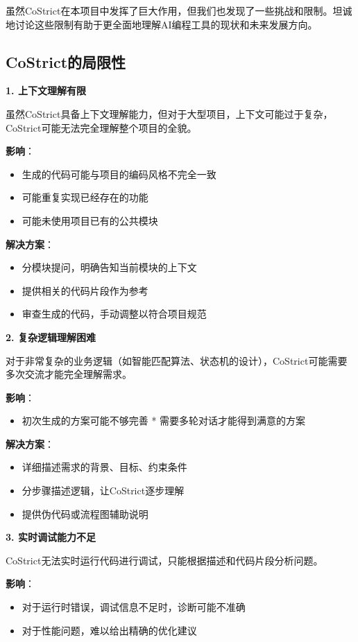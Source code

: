 ﻿\documentclass[12pt,a4paper]{article}
\begin{document}
虽然CoStrict在本项目中发挥了巨大作用，但我们也发现了一些挑战和限制。坦诚地讨论这些限制有助于更全面地理解AI编程工具的现状和未来发展方向。

\subsection{CoStrict的局限性}

\textbf{1. 上下文理解有限}

虽然CoStrict具备上下文理解能力，但对于大型项目，上下文可能过于复杂，CoStrict可能无法完全理解整个项目的全貌。

\textbf{影响}：
\begin{itemize}
    \item 生成的代码可能与项目的编码风格不完全一致
    \item 可能重复实现已经存在的功能
    \item 可能未使用项目已有的公共模块
\end{itemize}

\textbf{解决方案}：
\begin{itemize}
    \item 分模块提问，明确告知当前模块的上下文
    \item 提供相关的代码片段作为参考
    \item 审查生成的代码，手动调整以符合项目规范
\end{itemize}

\textbf{2. 复杂逻辑理解困难}

对于非常复杂的业务逻辑（如智能匹配算法、状态机的设计），CoStrict可能需要多次交流才能完全理解需求。

\textbf{影响}：
\begin{itemize}
    \item 初次生成的方案可能不够完善
    * 需要多轮对话才能得到满意的方案
\end{itemize}

\textbf{解决方案}：
\begin{itemize}
    \item 详细描述需求的背景、目标、约束条件
    \item 分步骤描述逻辑，让CoStrict逐步理解
    \item 提供伪代码或流程图辅助说明
\end{itemize}

\textbf{3. 实时调试能力不足}

CoStrict无法实时运行代码进行调试，只能根据描述和代码片段分析问题。

\textbf{影响}：
\begin{itemize}
    \item 对于运行时错误，调试信息不足时，诊断可能不准确
    \item 对于性能问题，难以给出精确的优化建议
\end{itemize}
\end{document}
